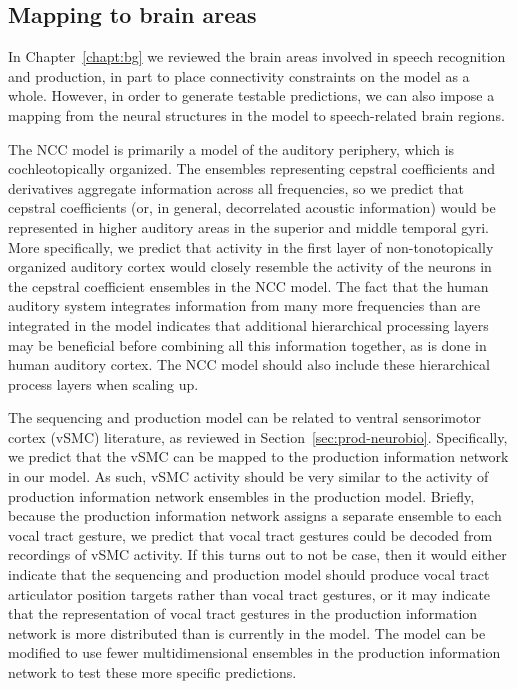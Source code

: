 \subsection{Mapping to brain areas}

In Chapter~\ref{chapt:bg}
we reviewed the brain areas
involved in speech recognition and production,
in part to place connectivity constraints
on the model as a whole.
However, in order to generate testable predictions,
we can also impose a mapping from
the neural structures in the model
to speech-related brain regions.

The NCC model is primarily a model
of the auditory periphery,
which is cochleotopically organized.
The ensembles representing
cepstral coefficients and derivatives
aggregate information across
all frequencies,
so we predict that cepstral coefficients
(or, in general, decorrelated acoustic information)
would be represented
in higher auditory areas in the
superior and middle temporal gyri.
More specifically,
we predict that activity in the
first layer of non-tonotopically organized
auditory cortex would
closely resemble the activity of
the neurons in the cepstral coefficient
ensembles in the NCC model.
The fact that the
human auditory system integrates information
from many more frequencies than
are integrated in the model
indicates that additional
hierarchical processing layers may be beneficial
before combining all this information together,
as is done in human auditory cortex.
The NCC model should also
include these hierarchical process layers
when scaling up.

The sequencing and production model
can be related to
ventral sensorimotor cortex (vSMC) literature,
as reviewed in Section~\ref{sec:prod-neurobio}.
Specifically, we predict that
the vSMC can be mapped to the
production information network in our model.
As such, vSMC activity should be very similar
to the activity of production information network
ensembles in the production model.
Briefly, because the production information network
assigns a separate ensemble to each
vocal tract gesture, we predict that
vocal tract gestures could be decoded
from recordings of vSMC activity.
If this turns out to not be case,
then it would either indicate that
the sequencing and production model
should produce vocal tract articulator position targets
rather than vocal tract gestures,
or it may indicate that the representation
of vocal tract gestures
in the production information network
is more distributed than is currently in the model.
The model can be modified to use
fewer multidimensional ensembles
in the production information network to test
these more specific predictions.

